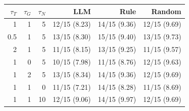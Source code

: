 \begin{tabular}{rrrrrr}
\toprule
$\tau_T$ & $\tau_G$ & $\tau_N$ & LLM & Rule & Random \\
\midrule
1 & 1 & 5 & 12/15 (8.23) & 14/15 (9.36) & 12/15 (9.69) \\
0.5 & 1 & 5 & 13/15 (8.30) & 15/15 (9.40) & 13/15 (9.73) \\
2 & 1 & 5 & 11/15 (8.15) & 13/15 (9.25) & 11/15 (9.57) \\
1 & 0 & 5 & 10/15 (7.98) & 11/15 (8.76) & 12/15 (9.63) \\
1 & 2 & 5 & 13/15 (8.34) & 14/15 (9.36) & 12/15 (9.69) \\
1 & 1 & 0 & 11/15 (7.21) & 14/15 (8.28) & 11/15 (8.69) \\
1 & 1 & 10 & 12/15 (9.06) & 14/15 (9.97) & 12/15 (9.69) \\
\bottomrule
\end{tabular}